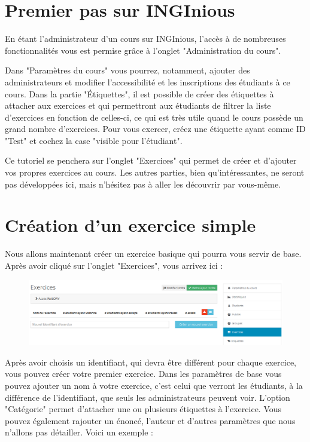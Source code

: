 \documentclass{article}
\begin{document}


\tableofcontents
\thispagestyle{empty}
\setcounter{page}{0}
\newpage

\section{Premier pas sur INGInious}

En étant l'administrateur d'un cours sur INGInious, l'accès à de nombreuses fonctionnalités vous est permise grâce à l'onglet "Administration du cours". 

Dans "Paramètres du cours" vous pourrez, notamment, ajouter des administrateurs et modifier l'accessibilité et les inscriptions des étudiants à ce cours. Dans la partie "Étiquettes", il est possible de créer des étiquettes à attacher aux exercices et qui permettront aux étudiants de filtrer la liste d'exercices en fonction de celles-ci, ce qui est très utile quand le cours possède un grand nombre d'exercices. Pour vous exercer, créez une étiquette ayant comme ID "Test" et cochez la case "visible pour l'étudiant".

Ce tutoriel se penchera sur l'onglet "Exercices" qui permet de créer et d'ajouter vos propres exercices au cours. Les autres parties, bien qu'intéressantes, ne seront pas développées ici, mais n'hésitez pas à aller les découvrir par vous-même. 

\section{Création d'un exercice simple}

Nous allons maintenant créer un exercice basique qui pourra vous servir de base. Après avoir cliqué sur l'onglet "Exercices", vous arrivez ici :

\begin{figure}[h]
    \centering
    \includegraphics[scale=0.5]{images/Exercices.PNG}
\end{figure}

Après avoir choisis un identifiant, qui devra être différent pour chaque exercice, vous pouvez créer votre premier exercice.
Dans les paramètres de base vous pouvez ajouter un nom à votre exercice, c'est celui que verront les étudiants, à la différence de l'identifiant, que seuls les administrateurs peuvent voir.  L'option "Catégorie" permet d'attacher une ou plusieurs étiquettes à l'exercice. Vous pouvez également rajouter un énoncé, l'auteur et d'autres paramètres que nous n'allons pas détailler. Voici un exemple :
\end{document}
